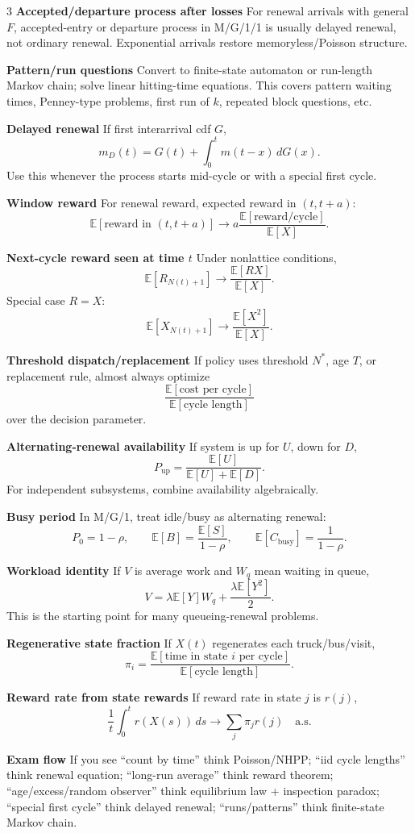 \documentclass[a4paper,8pt,fleqn]{extarticle}
\newcommand{\E}{\mathbb{E}}
\newcommand{\1}{\mathbf{1}}
\newcommand{\sub}[1]{\textbf{#1} }
\begin{document}
\begin{multicols}{3}
\sub{Accepted/departure process after losses} For renewal arrivals with general \(F\), accepted-entry or departure process in M/G/1/1 is usually delayed renewal, not ordinary renewal. Exponential arrivals restore memoryless/Poisson structure.

\sub{Pattern/run questions} Convert to finite-state automaton or run-length Markov chain; solve linear hitting-time equations. This covers pattern waiting times, Penney-type problems, first run of \(k\), repeated block questions, etc.

\sub{Delayed renewal} If first interarrival cdf \(G\),
\[
m_D(t)=G(t)+\int_0^t m(t-x)\,dG(x).
\]
Use this whenever the process starts mid-cycle or with a special first cycle.

\sub{Window reward} For renewal reward, expected reward in \((t,t+a)\):
\[
\E[\text{reward in }(t,t+a)]\to a\frac{\E[\text{reward/cycle}]}{\E[X]}.
\]

\sub{Next-cycle reward seen at time \(t\)} Under nonlattice conditions,
\[
\E[R_{N(t)+1}]\to \frac{\E[RX]}{\E[X]}.
\]
Special case \(R=X\):
\[
\E[X_{N(t)+1}]\to \frac{\E[X^2]}{\E[X]}.
\]

\sub{Threshold dispatch/replacement} If policy uses threshold \(N^*\), age \(T\), or replacement rule, almost always optimize
\[
\frac{\E[\text{cost per cycle}]}{\E[\text{cycle length}]}
\]
over the decision parameter.

\sub{Alternating-renewal availability} If system is up for \(U\), down for \(D\),
\[
P_{\text{up}}=\frac{\E[U]}{\E[U]+\E[D]}.
\]
For independent subsystems, combine availability algebraically.

\sub{Busy period} In M/G/1, treat idle/busy as alternating renewal:
\[
P_0=1-\rho,\qquad
\E[B]=\frac{\E[S]}{1-\rho},\qquad
\E[C_{\text{busy}}]=\frac{1}{1-\rho}.
\]

\sub{Workload identity} If \(V\) is average work and \(W_q\) mean waiting in queue,
\[
V=\lambda \E[Y]W_q+\frac{\lambda \E[Y^2]}{2}.
\]
This is the starting point for many queueing-renewal problems.

\sub{Regenerative state fraction} If \(X(t)\) regenerates each truck/bus/visit,
\[
\pi_i=\frac{\E[\text{time in state }i\text{ per cycle}]}{\E[\text{cycle length}]}.
\]

\sub{Reward rate from state rewards} If reward rate in state \(j\) is \(r(j)\),
\[
\frac{1}{t}\int_0^t r(X(s))\,ds\to \sum_j \pi_j r(j)\quad \text{a.s.}
\]

\sub{Exam flow} If you see ``count by time'' think Poisson/NHPP; ``iid cycle lengths'' think renewal equation; ``long-run average'' think reward theorem; ``age/excess/random observer'' think equilibrium law + inspection paradox; ``special first cycle'' think delayed renewal; ``runs/patterns'' think finite-state Markov chain.


\end{multicols}
\end{document}
